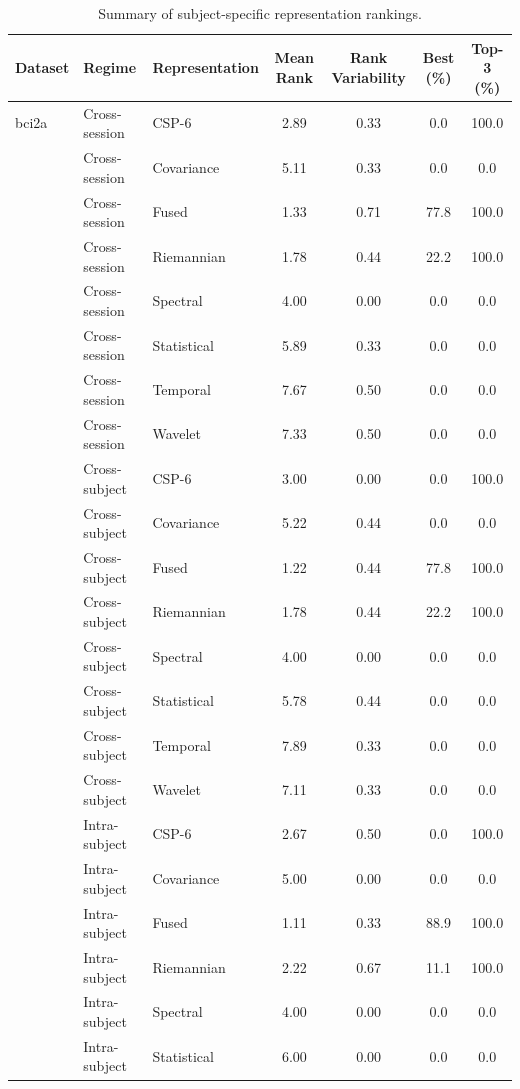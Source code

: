 \begin{table}[t]
\centering
\small
\caption{Summary of subject-specific representation rankings.}
\label{tab:subject_ranking_summary}
\begin{tabular}{lllcccc}
\toprule
\textbf{Dataset} & \textbf{Regime} & \textbf{Representation} &
\textbf{Mean Rank} & \textbf{Rank Variability} &
\textbf{Best (\%)} & \textbf{Top-3 (\%)} \\
\midrule
bci2a & Cross-session & CSP-6 & 2.89 & 0.33 & 0.0 & 100.0 \\
 & Cross-session & Covariance & 5.11 & 0.33 & 0.0 & 0.0 \\
 & Cross-session & Fused & 1.33 & 0.71 & 77.8 & 100.0 \\
 & Cross-session & Riemannian & 1.78 & 0.44 & 22.2 & 100.0 \\
 & Cross-session & Spectral & 4.00 & 0.00 & 0.0 & 0.0 \\
 & Cross-session & Statistical & 5.89 & 0.33 & 0.0 & 0.0 \\
 & Cross-session & Temporal & 7.67 & 0.50 & 0.0 & 0.0 \\
 & Cross-session & Wavelet & 7.33 & 0.50 & 0.0 & 0.0 \\
 & Cross-subject & CSP-6 & 3.00 & 0.00 & 0.0 & 100.0 \\
 & Cross-subject & Covariance & 5.22 & 0.44 & 0.0 & 0.0 \\
 & Cross-subject & Fused & 1.22 & 0.44 & 77.8 & 100.0 \\
 & Cross-subject & Riemannian & 1.78 & 0.44 & 22.2 & 100.0 \\
 & Cross-subject & Spectral & 4.00 & 0.00 & 0.0 & 0.0 \\
 & Cross-subject & Statistical & 5.78 & 0.44 & 0.0 & 0.0 \\
 & Cross-subject & Temporal & 7.89 & 0.33 & 0.0 & 0.0 \\
 & Cross-subject & Wavelet & 7.11 & 0.33 & 0.0 & 0.0 \\
 & Intra-subject & CSP-6 & 2.67 & 0.50 & 0.0 & 100.0 \\
 & Intra-subject & Covariance & 5.00 & 0.00 & 0.0 & 0.0 \\
 & Intra-subject & Fused & 1.11 & 0.33 & 88.9 & 100.0 \\
 & Intra-subject & Riemannian & 2.22 & 0.67 & 11.1 & 100.0 \\
 & Intra-subject & Spectral & 4.00 & 0.00 & 0.0 & 0.0 \\
 & Intra-subject & Statistical & 6.00 & 0.00 & 0.0 & 0.0 \\

\end{tabular}
\end{table}
